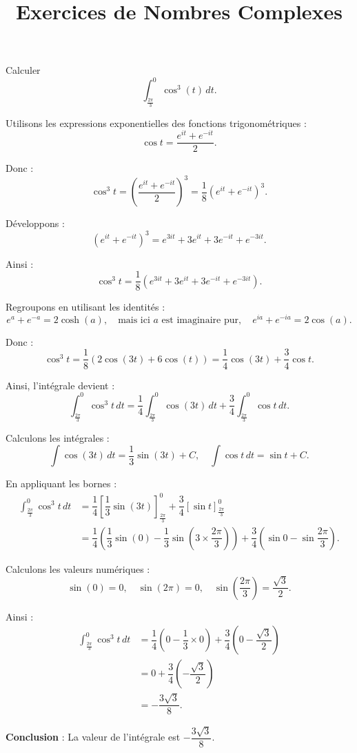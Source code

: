 \documentclass[a4paper,12pt]{article}
\title{Exercices de Nombres Complexes}
\author{}
\date{}
\begin{document}
\begin{tcolorbox}[title=Exercice 5 - {[}Calculer{]}]
Calculer
\[
\int_{\frac{2\pi}{3}}^{0} \cos^3(t) \, dt.
\]
\end{tcolorbox}

\begin{solutionbox}
Utilisons les expressions exponentielles des fonctions trigonométriques :
\[
\cos t = \dfrac{e^{it} + e^{-it}}{2}.
\]

Donc :
\[
\cos^3 t = \left( \dfrac{e^{it} + e^{-it}}{2} \right)^3 = \dfrac{1}{8} \left( e^{it} + e^{-it} \right)^3.
\]

Développons :
\[
\left( e^{it} + e^{-it} \right)^3 = e^{3it} + 3e^{it} + 3e^{-it} + e^{-3it}.
\]

Ainsi :
\[
\cos^3 t = \dfrac{1}{8} \left( e^{3it} + 3e^{it} + 3e^{-it} + e^{-3it} \right).
\]

Regroupons en utilisant les identités :
\[
e^{a} + e^{-a} = 2\cosh(a), \quad \text{mais ici } a \text{ est imaginaire pur}, \quad e^{ia} + e^{-ia} = 2\cos(a).
\]

Donc :
\[
\cos^3 t = \dfrac{1}{8} \left( 2\cos(3t) + 6\cos(t) \right) = \dfrac{1}{4} \cos(3t) + \dfrac{3}{4} \cos t.
\]

Ainsi, l'intégrale devient :
\[
\int_{\frac{2\pi}{3}}^{0} \cos^3 t \, dt = \dfrac{1}{4} \int_{\frac{2\pi}{3}}^{0} \cos(3t) \, dt + \dfrac{3}{4} \int_{\frac{2\pi}{3}}^{0} \cos t \, dt.
\]

Calculons les intégrales :
\[
\int \cos(3t) \, dt = \dfrac{1}{3} \sin(3t) + C, \quad \int \cos t \, dt = \sin t + C.
\]

En appliquant les bornes :
\begin{align*}
\int_{\frac{2\pi}{3}}^{0} \cos^3 t \, dt &= \dfrac{1}{4} \left[ \dfrac{1}{3} \sin(3t) \right]_{\frac{2\pi}{3}}^{0} + \dfrac{3}{4} \left[ \sin t \right]_{\frac{2\pi}{3}}^{0} \\
&= \dfrac{1}{4} \left( \dfrac{1}{3} \sin(0) - \dfrac{1}{3} \sin\left( 3 \times \dfrac{2\pi}{3} \right) \right) + \dfrac{3}{4} \left( \sin 0 - \sin \dfrac{2\pi}{3} \right).
\end{align*}

Calculons les valeurs numériques :
\[
\sin(0) = 0, \quad \sin\left( 2\pi \right) = 0, \quad \sin\left( \dfrac{2\pi}{3} \right) = \dfrac{\sqrt{3}}{2}.
\]

Ainsi :
\begin{align*}
\int_{\frac{2\pi}{3}}^{0} \cos^3 t \, dt &= \dfrac{1}{4} \left( 0 - \dfrac{1}{3} \times 0 \right) + \dfrac{3}{4} \left( 0 - \dfrac{\sqrt{3}}{2} \right) \\
&= 0 + \dfrac{3}{4} \left( -\dfrac{\sqrt{3}}{2} \right) \\
&= -\dfrac{3\sqrt{3}}{8}.
\end{align*}

\textbf{Conclusion} : La valeur de l'intégrale est \( -\dfrac{3\sqrt{3}}{8} \).
\end{solutionbox}
\end{document}
